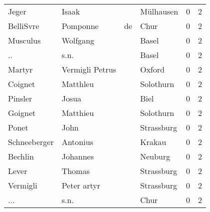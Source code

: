 \begin{tabular}{llllrr}
                    Jeger &                              Isaak &             &                                   Mülhausen &          0 &         2 \\
                BelliSvre &                           Pomponne &          de &                                        Chur &          0 &         2 \\
                 Musculus &                           Wolfgang &             &                                       Basel &          0 &         2 \\
                       .. &                               s.n. &             &                                       Basel &          0 &         2 \\
                   Martyr &                    Vermigli Petrus &             &                                      Oxford &          0 &         2 \\
                  Coignet &                           Matthleu &             &                                   Solothurn &          0 &         2 \\
                  Pinsler &                              Josua &             &                                        Biel &          0 &         2 \\
                  Goignet &                           Matthieu &             &                                   Solothurn &          0 &         2 \\
                    Ponet &                               John &             &                                  Strassburg &          0 &         2 \\
             Schneeberger &                           Antonius &             &                                      Krakau &          0 &         2 \\
                  Bechlin &                           Johannes &             &                                     Neuburg &          0 &         2 \\
                    Lever &                             Thomas &             &                                  Strassburg &          0 &         2 \\
                 Vermigli &                        Peter artyr &             &                                  Strassburg &          0 &         2 \\
                      ... &                               s.n. &             &                                        Chur &          0 &         2 \\

\end{tabular}
